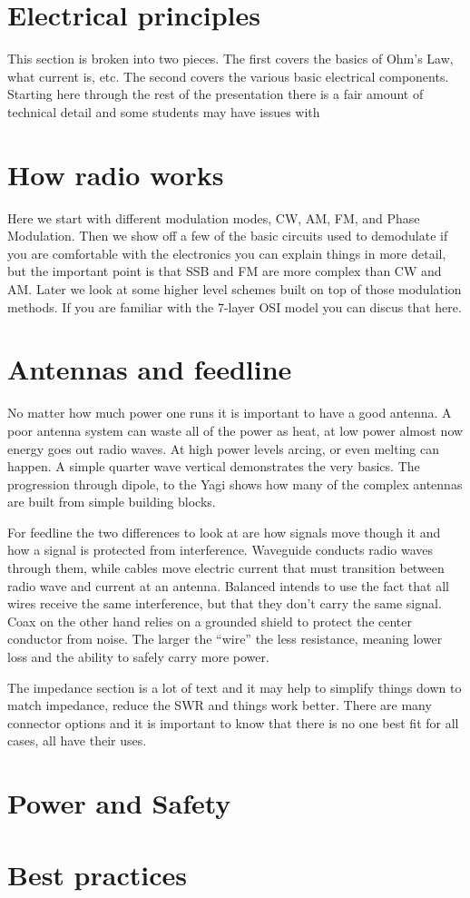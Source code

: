 \documentclass[12pt,letterpaper]{report}
\begin{document}
\section*{Electrical principles}
This section is broken into two pieces. The first covers the basics of Ohm's Law, what current is, etc. The second covers the various basic electrical components. Starting here through the rest of the presentation there is a fair amount of technical detail and some students may have issues with 

\section*{How radio works}
Here we start with different modulation modes, CW, AM, FM, and Phase Modulation. Then we show off a few of the basic circuits used to demodulate if you are comfortable with the electronics you can explain things in more detail, but the important point is that SSB and FM are more complex than CW and AM. Later we look at some higher level schemes built on top of those modulation methods. If you are familiar with the 7-layer OSI model you can discus that here.

\section*{Antennas and feedline}
No matter how much power one runs it is important to have a good antenna. A poor antenna system can waste all of the power as heat, at low power almost now energy goes out radio waves. At high power levels arcing, or even melting can happen. A simple quarter wave vertical demonstrates the very basics. The progression through dipole, to the Yagi shows how many of the complex antennas are built from simple building blocks. 

For feedline the two differences to look at are how signals move though it and how a signal is protected from interference. Waveguide conducts radio waves through them, while cables move electric current that must transition between radio wave and current at an antenna. Balanced intends to use the fact that all wires receive the same interference, but that they don't carry the same signal. Coax on the other hand relies on a grounded shield to protect the center conductor from noise. The larger the ``wire'' the less resistance, meaning lower loss and the ability to safely carry more power.

The impedance section is a lot of text and it may help to simplify things down to match impedance, reduce the SWR and things work better. There are many connector options and it is important to know that there is no one best fit for all cases, all have their uses. 

\section*{Power and Safety}

\section*{Best practices}
\end{document}
